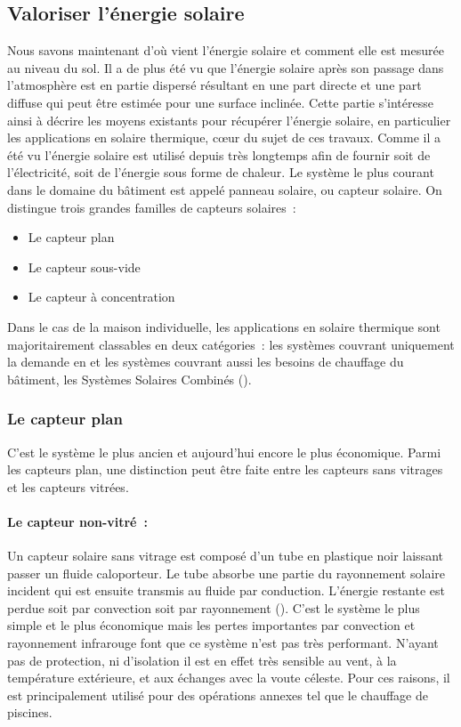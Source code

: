 \subsection{Valoriser l’énergie solaire} %
\label{sub:valoriser_l_energie_solaire}
Nous savons maintenant d’où vient l’énergie solaire et comment elle est mesurée au niveau
du sol. Il a de plus été vu que l’énergie solaire après son passage dans l’atmosphère est
en partie dispersé résultant en une part directe et une part diffuse qui peut être estimée
pour une surface inclinée. Cette partie s’intéresse ainsi à décrire les moyens existants
pour récupérer l’énergie solaire, en particulier les applications en solaire thermique,
cœur du sujet de ces travaux. Comme il a été vu l’énergie solaire est utilisé depuis très
longtemps afin de fournir soit de l’électricité, soit de l’énergie sous forme de chaleur.
Le système le plus courant dans le domaine du bâtiment est appelé panneau solaire, ou
capteur solaire. On distingue trois grandes familles de capteurs solaires~:
\begin{itemize}
    \item Le capteur plan
    \item Le capteur sous-vide
    \item Le capteur à concentration
\end{itemize}

Dans le cas de la maison individuelle, les applications en solaire thermique sont
majoritairement classables en deux catégories~: les systèmes couvrant uniquement
la demande en  et les systèmes couvrant aussi les besoins de chauffage
du bâtiment, les Systèmes Solaires Combinés ().


\subsubsection{Le capteur plan} %
\label{ssub:le_capteur_plan}
C’est le système le plus ancien et aujourd’hui encore le plus économique. Parmi les
capteurs plan, une distinction peut être faite entre les capteurs sans vitrages
et les capteurs vitrées.

\paragraph{Le capteur non-vitré~:} %
\label{par:le_capteur_non_vitre}
Un capteur solaire sans vitrage est composé d’un tube en plastique noir laissant passer un
fluide caloporteur. Le tube absorbe une partie du rayonnement solaire incident qui est
ensuite transmis au fluide par conduction. L’énergie restante est perdue soit par
convection soit par rayonnement (). C’est le système le plus
simple et le plus économique mais les pertes importantes par convection et rayonnement
infrarouge font que ce système n’est pas très performant. N’ayant pas de protection, ni
d’isolation il est en effet très sensible au vent, à la température extérieure, et aux
échanges avec la voute céleste. Pour ces raisons, il est principalement utilisé pour des
opérations annexes tel que le chauffage de piscines.

